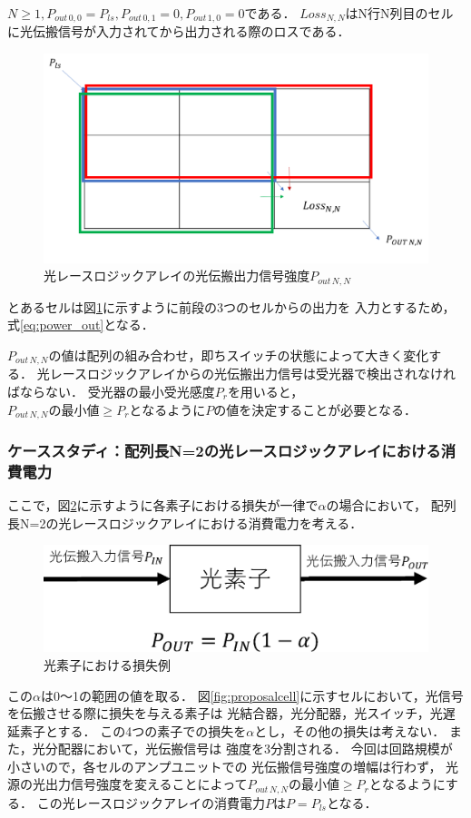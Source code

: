 $N \geq 1,P_{out\,0,0}=P_{ls},P_{out\,0,1}=0,P_{out\,1,0}=0である．$
$Loss_{N,N}$はN行N列目のセルに光伝搬信号が入力されてから出力される際のロスである．
\begin{figure}[t!]
\begin{center}
\includegraphics[keepaspectratio,scale=0.5]{fig/4/nanopower.png}
\caption{光レースロジックアレイの光伝搬出力信号強度$P_{out\,N,N}$}
\label{fig:nanopower}
\end{center}
\end{figure}
とあるセルは図\ref{fig:nanopower}に示すように前段の3つのセルからの出力を
入力とするため，式\ref{eq:power_out}となる．

$P_{out\,N,N}$の値は配列の組み合わせ，即ちスイッチの状態によって大きく変化する．
光レースロジックアレイからの光伝搬出力信号は受光器で検出されなければならない．
受光器の最小受光感度$P_{r}$を用いると，
$P_{out\,N,N}の最小値 \geq P_{r}となるようにP$の値を決定することが必要となる．

\subsubsection{ケーススタディ：配列長N=2の光レースロジックアレイにおける消費電力}
ここで，図\ref{fig:loss}に示すように各素子における損失が一律で$\alpha$の場合において，
配列長N=2の光レースロジックアレイにおける消費電力を考える．
\begin{figure}[t!]
\begin{center}
\includegraphics[keepaspectratio,scale=0.5]{fig/4/loss.eps}
\caption{光素子における損失例}
\label{fig:loss}
\end{center}
\end{figure}
この$\alpha$は0〜1の範囲の値を取る．
図\ref{fig:proposalcell}に示すセルにおいて，光信号を伝搬させる際に損失を与える素子は
光結合器，光分配器，光スイッチ，光遅延素子とする．
この4つの素子での損失を$\alpha$とし，その他の損失は考えない．
また，光分配器において，光伝搬信号は
強度を3分割される．
今回は回路規模が小さいので，各セルのアンプユニットでの
光伝搬信号強度の増幅は行わず，
光源の光出力信号強度を変えることによって$P_{out\,N,N}の最小値 \geq P_{r}となるように$する．
この光レースロジックアレイの消費電力$PはP=P_{ls}$となる．

